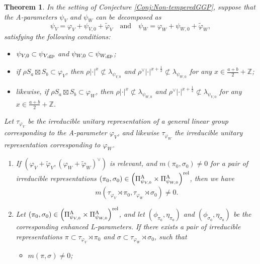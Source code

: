 \documentclass[11pt,letterpaper]{amsart}
\theoremstyle{plain}
\newcounter{theorem}[section]
\numberwithin{theorem}{section}
\numberwithin{equation}{subsection}
\newtheorem{Thm}[theorem]{Theorem}
\theoremstyle{remark}
\newcommand{\Z}{\mathbb{Z}}
\def\AP{\Pi^{\rm A}} %
\def\gp{{\rm gp}} %
\def\rel{{\rm rel}} %
\begin{document}
\begin{Thm}\label{T:ReductionToGoodParity}
In the setting of Conjecture \ref{Conj:Non-temperedGGP}, suppose that the A-parameters $\psi_V$ and $\psi_W$ can be decomposed as
\[
    \psi_V = \varphi_V + \psi_{V,0} + \widetilde{\varphi}_V \quad \text{and} \quad \psi_W = \varphi_W + \psi_{W,0} + \widetilde{\varphi}_{W},
\]
satisfying the following conditions:
\begin{itemize}
    \item $\psi_{V,0}\subset \psi_{V,\gp}$ and $\psi_{W,0}\subset \psi_{W,\gp}$;

    \vskip 5pt

    \item if $\rho S_a\boxtimes S_b\subset \varphi_{V}$, then $\rho|\cdot|^x\not\subset\lambda_{\psi_{V,0}}$ and $\rho^\vee|\cdot|^{x+\frac{1}{2}} \not\subset \lambda_{\psi_{W,0}}$ for any $x\in\frac{a+b}{2}+\Z$;

    \vskip 5pt

    \item likewise, if $\rho S_a\boxtimes S_b\subset \varphi_{W}$, then $\rho|\cdot|^x\not\subset\lambda_{\psi_{W,0}}$ and $\rho^\vee|\cdot|^{x+\frac{1}{2}} \not\subset \lambda_{\psi_{V,0}}$ for any $x\in\frac{a+b}{2}+\Z$.
\end{itemize}
\vskip 5pt
Let $\tau_{\varphi_V}$ be the irreducible unitary representation of a general linear group corresponding to the A-parameter $\varphi_V$, and likewise $\tau_{\varphi_W}$ the irreducible unitary representation corresponding to $\varphi_W$.
\begin{enumerate}
    \item If $\left(\varphi_V + \widetilde{\varphi}_V,\left(\varphi_W + \widetilde{\varphi}_W\right)^\vee\right)$ is relevant, and $m\left(\pi_0,\sigma_0\right)\neq0$ for a pair of irreducible representations $\left(\pi_0,\sigma_0\right)\in \left(\AP_{\psi_{V,0}}\times\AP_{\psi_{W,0}}\right)^\rel$, then we have
    \[
        m\left(\tau_{\varphi_V}\rtimes\pi_0, \tau_{\varphi_W}\rtimes \sigma_0\right) \neq 0.
    \] 

    \vskip 5pt

    \item Let $\left(\pi_0,\sigma_0\right)\in \left(\AP_{\psi_{V,0}}\times\AP_{\psi_{W,0}}\right)^\rel$, and let $\left(\phi_{\pi_0},\eta_{\pi_0}\right)$ and $\left(\phi_{\sigma_0},\eta_{\sigma_0}\right)$ be the corresponding enhanced L-parameters. If there exists a pair of irreducible representations $\pi\subset\tau_{\varphi_V}\rtimes\pi_0$ and $\sigma\subset\tau_{\varphi_W}\rtimes\sigma_0$, such that
    \vskip 5pt
    \begin{itemize}
        \item $m\left(\pi,\sigma\right)\neq 0$;


\end{itemize}
\end{enumerate}
\end{Thm}
\end{document}
